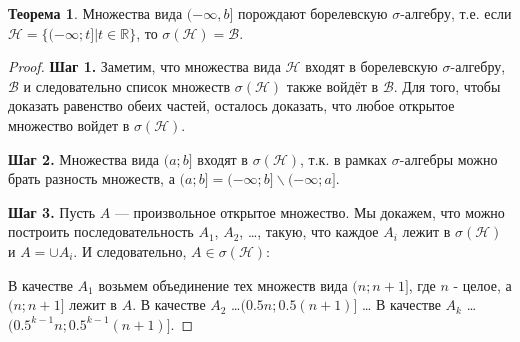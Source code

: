 \documentclass[pdftex, 12pt, a4paper]{article}
\def\R{\ensuremath{\mathbb{R}}} %
\def\B{\ensuremath{\mathcal{B}}} %
\def\s{\ensuremath{\sigma}}
\theoremstyle{definition} %
\newtheorem{myth}{Теорема}
\numberwithin{problem}{section}
\numberwithin{blits}{section}
\begin{document}
\begin{myth} \label{generate_borel}
Множества вида $(-\infty,b]$ порождают борелевскую \s-алгебру, т.е. если $\mathcal{H}=\{(-\infty;t]|t\in\R\}$, то $\s(\mathcal{H})=\B$.
\end{myth}
\begin{proof} \textbf{Шаг 1.} Заметим, что множества вида $\mathcal{H}$ входят в борелевскую \s-алгебру, $\B$ и следовательно список множеств $\s(\mathcal{H})$ также войдёт в $\B$. Для того, чтобы доказать равенство обеих частей, осталось доказать, что любое открытое множество войдет в $\s(\mathcal{H})$.

\textbf{Шаг 2.} Множества вида $(a;b]$ входят в $\s(\mathcal{H})$, т.к. в рамках \s-алгебры можно брать разность множеств, а $(a;b]=(-\infty;b]\backslash (-\infty;a]$.

\textbf{Шаг 3.} Пусть $A$ --- произвольное открытое множество. Мы докажем, что можно построить последовательность $A_{1}$, $A_{2}$, \ldots , такую, что каждое $A_{i}$ лежит в $\s(\mathcal{H})$ и $A=\cup A_{i}$. И следовательно, $A\in\s(\mathcal{H})$:

В качестве $A_{1}$ возьмем объединение тех множеств вида $(n;n+1]$, где $n$ - целое, а $(n;n+1]$ лежит в $A$.
В качестве $A_{2}$ \ldots  $(0.5n;0.5(n+1)]$
\ldots
В качестве $A_{k}$ \ldots  $(0.5^{k-1}n;0.5^{k-1}(n+1)]$.


\end{proof}
\end{document}
